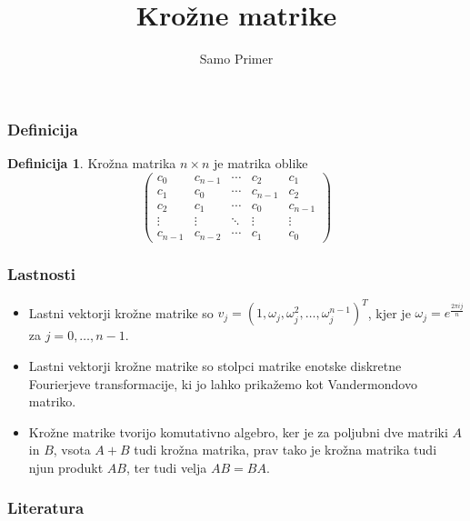 \documentclass{beamer}
\title{Krožne matrike}
\author{Samo Primer}
\date{}
\institute[FMF]{Fakulteta za matematiko in fiziko}
\theoremstyle{definition}
\newtheorem{definicija}{Definicija}
\begin{document}
\begin{frame}
        \titlepage
\end{frame}


\begin{frame}
        \frametitle{Definicija}
\begin{definicija}
    Krožna matrika $n \times n$ je matrika oblike 
\begin{equation*}
  \left(
  \begin{matrix}
    c_0 & c_{n-1} & \cdots & c_2 & c_1 \\
    c_1 & c_0 & \cdots & c_{n-1} & c_2 \\
    c_2 & c_1 & \cdots & c_0 & c_{n-1} \\
    \vdots  & \vdots  & \ddots & \vdots & \vdots \\
    c_{n-1} & c_{n-2} & \cdots & c_1 & c_0
  \end{matrix}
  \right)
\end{equation*}
\end{definicija}       
\end{frame}

\begin{frame}
        \frametitle{Lastnosti}
\begin{itemize}[<+->]
        \item \label{lastnost 1}Lastni vektorji krožne matrike so 
        $v_j = (1, \omega_j, \omega_j^2, \ldots, \omega_j^{n-1})^T$, 
        kjer je $\omega_j=e^\frac{2\pi i j}{n}$ za $j=0, \ldots, n-1$.
        \item \label{lastnost 2} Lastni vektorji krožne matrike so stolpci matrike enotske diskretne Fourierjeve transformacije, 
        ki jo lahko prikažemo kot Vandermondovo matriko.
        \item \label{lastnost 3}Krožne matrike tvorijo komutativno algebro, ker je za poljubni dve matriki 
        $A$ in $B$, vsota $A + B$ tudi krožna matrika, prav tako je krožna matrika tudi njun produkt 
        $AB$, ter tudi velja $AB = BA$.
\end{itemize}
\end{frame}
\begin{frame}
        \cite{gray}
\frametitle{Literatura}


\end{frame}
\end{document}
